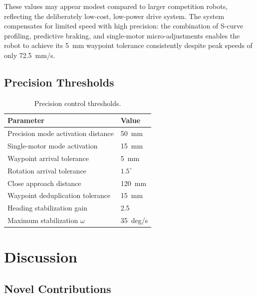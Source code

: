 \documentclass[12pt, a4paper, twoside]{article}
\begin{document}
These values may appear modest compared to larger competition robots, reflecting the deliberately low-cost, low-power drive system. The system compensates for limited speed with high precision: the combination of S-curve profiling, predictive braking, and single-motor micro-adjustments enables the robot to achieve its \SI{5}{\milli\metre} waypoint tolerance consistently despite peak speeds of only \SI{72.5}{mm/s}.

\subsection{Precision Thresholds}

\begin{table}[H]
    \centering
    \caption{Precision control thresholds.}
    \label{tab:precision}
    \begin{tabular}{@{}ll@{}}
        \toprule
        \textbf{Parameter} & \textbf{Value} \\
        \midrule
        Precision mode activation distance  & \SI{50}{\milli\metre} \\
        Single-motor mode activation        & \SI{15}{\milli\metre} \\
        Waypoint arrival tolerance           & \SI{5}{\milli\metre} \\
        Rotation arrival tolerance           & $1.5^\circ$ \\
        Close approach distance             & \SI{120}{\milli\metre} \\
        Waypoint deduplication tolerance     & \SI{15}{\milli\metre} \\
        Heading stabilization gain           & 2.5 \\
        Maximum stabilization $\omega$       & \SI{35}{deg/s} \\
        \bottomrule
    \end{tabular}
\end{table}

\section{Discussion}
\label{sec:discussion}

\subsection{Novel Contributions}
\end{document}
